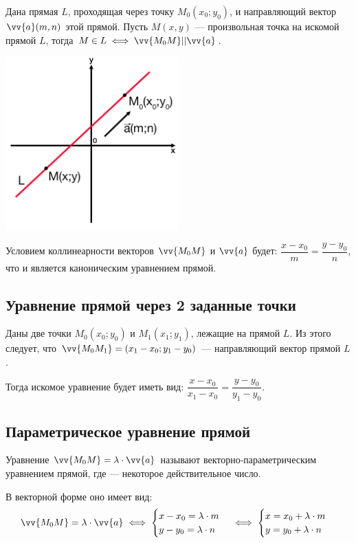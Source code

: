 \documentclass[a4paper,12pt,oneside]{extbook}
\theoremstyle{numbered}
\theoremstyle{unnumbered}
\theoremstyle{named}
\theoremstyle{unnumbered}
\theoremstyle{named}
\theoremstyle{named}
\theoremstyle{named}
\begin{document}
Дана прямая \(L\), проходящая через точку \(M_0(x_0;y_0)\), и направляющий вектор \(\vv{a}(m, n)\) этой прямой.
Пусть \(M(x, y)\) — произвольная точка на искомой прямой \(L\), тогда \(M \in L \iff \vv{M_0M} || \vv{a}\).

\begin{center}
    \includegraphics[width=0.5\textwidth]{kanon_line.png}
\end{center}

Условием коллинеарности векторов \(\vv{M_0M}\) и \(\vv{a}\) будет:
\(\dfrac{x - x_0}{m} = \dfrac{y - y_0}{n}\), что и является каноническим уравнением прямой.

\subsection{Уравнение прямой через 2 заданные точки}

Даны две точки \(M_0(x_0;y_0)\) и \(M_1(x_1;y_1)\), лежащие на прямой \(L\).
Из этого следует, что \(\vv{M_0M_1} = (x_1 - x_0; y_1 - y_0)\) — направляющий вектор прямой \(L\).

Тогда искомое уравнение будет иметь вид: \(\dfrac{x - x_0}{x_1 - x_0} = \dfrac{y - y_0}{y_1 - y_0}\).

\subsection{Параметрическое уравнение прямой}

Уравнение \(\vv{M_0M} = \lambda \cdot \vv{a}\) называют векторно-параметрическим уравнением прямой, где \lambda — некоторое действительное число.

В векторной форме оно имеет вид:
\begin{gather*}
    \vv{M_0M} = \lambda \cdot \vv{a} \iff
    \begin{cases}
        x - x_0 = \lambda \cdot m \\
        y - y_0 = \lambda \cdot n
    \end{cases}
    \iff
    \begin{cases}
        x = x_0 + \lambda \cdot m \\
        y = y_0 + \lambda \cdot n
    \end{cases}
\end{gather*}
\end{document}
